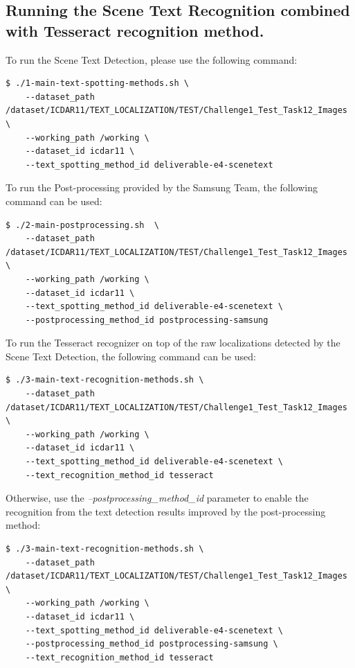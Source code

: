 \subsection{Running the Scene Text Recognition combined with Tesseract recognition method.}

To run the Scene Text Detection, please use the following command:
\begin{lstlisting}[style=fancyterminal]
 $ ./1-main-text-spotting-methods.sh \ 
    --dataset_path /dataset/ICDAR11/TEXT_LOCALIZATION/TEST/Challenge1_Test_Task12_Images \ 
    --working_path /working \ 
    --dataset_id icdar11 \ 
    --text_spotting_method_id deliverable-e4-scenetext
\end{lstlisting}

To run the Post-processing provided by the Samsung Team, the following command can be used:
\begin{lstlisting}[style=fancyterminal]
 $ ./2-main-postprocessing.sh  \ 
    --dataset_path /dataset/ICDAR11/TEXT_LOCALIZATION/TEST/Challenge1_Test_Task12_Images \ 
    --working_path /working \ 
    --dataset_id icdar11 \ 
    --text_spotting_method_id deliverable-e4-scenetext \ 
    --postprocessing_method_id postprocessing-samsung
\end{lstlisting}

To run the Tesseract recognizer on top of the raw localizations detected by the Scene Text Detection, the following command can be used:
\begin{lstlisting}[style=fancyterminal]
 $ ./3-main-text-recognition-methods.sh \ 
    --dataset_path /dataset/ICDAR11/TEXT_LOCALIZATION/TEST/Challenge1_Test_Task12_Images \ 
    --working_path /working \ 
    --dataset_id icdar11 \ 
    --text_spotting_method_id deliverable-e4-scenetext \ 
    --text_recognition_method_id tesseract
\end{lstlisting}

Otherwise, use the \textit{--postprocessing\_method\_id} parameter to enable the recognition from the text detection results improved by the post-processing method:
\begin{lstlisting}[style=fancyterminal]
 $ ./3-main-text-recognition-methods.sh \ 
    --dataset_path /dataset/ICDAR11/TEXT_LOCALIZATION/TEST/Challenge1_Test_Task12_Images \ 
    --working_path /working \ 
    --dataset_id icdar11 \ 
    --text_spotting_method_id deliverable-e4-scenetext \ 
    --postprocessing_method_id postprocessing-samsung \ 
    --text_recognition_method_id tesseract
\end{lstlisting}


